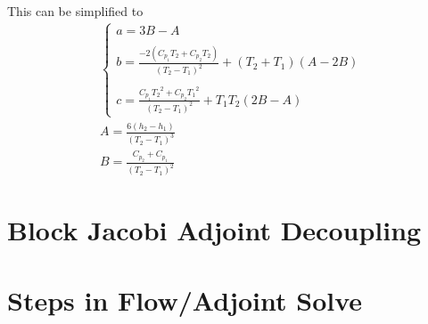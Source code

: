 \documentclass{article}   	%
\begin{document}
This can be simplified to
\begin{gather}
  \begin{cases}
    a=3B - A \\ \\
    b=\frac{-2(C_{p_1} T_2 + C_{p_2}T_2)}{(T_2 - T_1)^2} +(T_2+T_1) (A - 2B) \\ \\
    c=\frac{C_{p_1} {T_2}^2 + C_{p_2} {T_1}^2}{(T_2-T_1)^2} + T_1 T_2 (2B - A)
  \end{cases} \\
  A = \frac{6(h_2 - h_1)}{(T_2 - T_1)^3} \\
  B = \frac{C_{p_2} + C_{p_1}}{(T_2 - T_1)^2}
\end{gather}
\section{Block Jacobi Adjoint Decoupling}

\section{Steps in Flow/Adjoint Solve}
\end{document}

